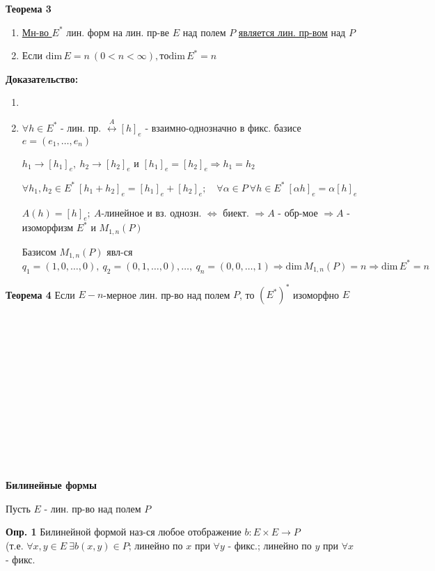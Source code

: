 \textbf{Теорема 3}
\begin{enumerate}
 \item \underline{Мн-во $E^*$} лин. форм на лин. пр-ве $E$ над полем $P$ \underline{является лин. пр-вом} над $P$
 \item Если $\mathrm{dim}\, E = n\ (0 < n <\infty), то \mathrm{dim}\, E^* = n$
\end{enumerate}

\textbf{Доказательство:}
\begin{enumerate}
 \item %
 \item $\forall h \in E^*$ - лин. пр. $\overset{A}\leftrightarrow [h]_e$ - взаимно-однозначно в фикс. базисе $e=(e_1, \ldots, e_n)$

    $h_1 \to [h_1]_e,\ h_2\to [h_2]_e$ и $[h_1]_e = [h_2]_e \Rightarrow h_1 = h_2$

    $\forall h_1, h_2 \in E^*\ [h_1 + h_2]_e = [h_1]_e + [h_2]_e;\quad \forall \alpha \in P\ \forall h\in E^*\ [\alpha h]_e = \alpha [h]_e$

    $A(h) = [h]_e;\ A$-линейное и вз. однозн. $\Leftrightarrow$ биект. $\Rightarrow A$ - обр-мое $\Rightarrow A$ - изоморфизм $E^*$ и $M_{1,n}(P)$

    Базисом $M_{1,n}(P)$ явл-ся $q_1=(1,0,\ldots,0),\ q_2=(0,1,\ldots,0),\ldots,\ q_n = (0,0,\ldots, 1) \Rightarrow \mathrm{dim}\, M_{1,n} (P) = n \Rightarrow \mathrm{dim}\, E^* = n$
\end{enumerate}

\textbf{Теорема 4} Если $E-n$-мерное лин. пр-во над полем $P$, то $(E^*)^*$ изоморфно $E$\\
\\
\\
\\
\\
\\
\\
\\
\\
\\
\\
\\ %
\\
\begin{center}
 \textbf{Билинейные формы}
\end{center}
Пусть $E$ - лин. пр-во над полем $P$

\textbf{Опр. 1} Билинейной формой наз-ся любое отображение $b : E \times E \to P\ $ \\
(т.е. $\forall x,y\in E\ \exists b(x,y)\in P$; линейно по $x$ при $\forall y$ - фикс.; линейно по $y$ при $\forall x$ - фикс.

